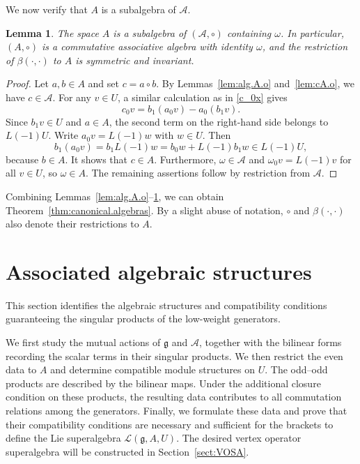 \documentclass[12pt]{article}
\numberwithin{equation}{section}
\newtheorem{lemma}[theorem]{Lemma}
\theoremstyle{definition}
\theoremstyle{plain}
\newcommand{\fg}{\mathfrak{g}}
\newcommand{\cA}{\ensuremath{\mathcal{A}}}
\newcommand{\cL}{\ensuremath{\mathcal{L}}}
\begin{document}
We now verify that $A$ is a subalgebra of $\cA$.

\begin{lemma}\label{lem:A.subalg}
    The space $A$ is a subalgebra of $(\cA,\circ)$ containing $\omega$. In particular, $(A,\circ)$ is a commutative associative algebra with identity $\omega$, and the restriction of $\beta(\cdot,\cdot)$ to $A$ is symmetric and invariant.
\end{lemma}
\begin{proof}
    Let $a,b\in A$ and set $c=a\circ b$. By Lemmas~\ref{lem:alg.A.o} and~\ref{lem:cA.o}, we have $c\in\cA$. For any $v\in U$, a similar calculation as in \eqref{c_0x} gives
    \begin{equation*}
        c_0v=b_1(a_0v)-a_0(b_1v).
    \end{equation*}
    Since $b_1v\in U$ and $a\in A$, the second term on the right-hand side belongs to $L(-1)U$. Write $a_0v=L(-1)w$ with $w\in U$. Then
    \begin{equation*}
        b_1(a_0v)=b_1L(-1)w=b_0w+L(-1)b_1w
        \in L(-1)U,
    \end{equation*}
    because $b\in A$. It shows that $c\in A$. Furthermore, $\omega\in\cA$ and $\omega_0v=L(-1)v$ for all $v\in U$, so $\omega\in A$. The remaining assertions follow by restriction from $\cA$.
\end{proof}

Combining Lemmas~\ref{lem:alg.A.o}--\ref{lem:A.subalg}, we can obtain Theorem~\ref{thm:canonical.algebras}. By a slight abuse of notation, $\circ$ and $\beta(\cdot,\cdot)$ also denote their restrictions to $A$.


\section{Associated algebraic structures}\label{sect:data}
\hspace{1.5em}This section identifies the algebraic structures and compatibility conditions guaranteeing the singular products of the low-weight generators.

We first study the mutual actions of $\fg$ and $\cA$, together with the bilinear forms recording the scalar terms in their singular products. We then restrict the even data to $A$ and determine compatible module structures on $U$. The odd--odd products are described by the bilinear maps. Under the additional closure condition on these products,
the resulting data contributes to all commutation relations among the generators. Finally, we formulate these data and prove that their compatibility conditions are necessary and sufficient for the brackets to define the Lie superalgebra $\cL(\fg,A,U)$. The desired vertex operator superalgebra will be constructed in Section~\ref{sect:VOSA}.
\end{document}
